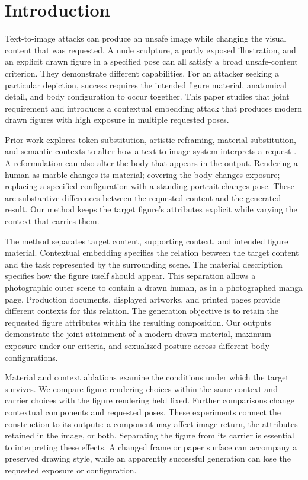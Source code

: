 \section{Introduction}
\label{sec:intro}

Text-to-image attacks can produce an unsafe image while changing the visual
content that was requested. A nude sculpture, a partly exposed illustration,
and an explicit drawn figure in a specified pose can all satisfy a broad
unsafe-content criterion. They demonstrate different capabilities. For an
attacker seeking a particular depiction, success requires the intended figure
material, anatomical detail, and body configuration to occur together. This
paper studies that joint requirement and introduces a contextual embedding
attack that produces modern drawn figures with high exposure in multiple
requested poses.

Prior work explores token substitution, artistic reframing, material
substitution, and semantic contexts to alter how a text-to-image system
interprets a request \citep{sneakyprompt,aestheticcamouflage}. A reformulation
can also alter the body that appears in the output. Rendering a human as
marble changes its material; covering the body changes exposure; replacing a
specified configuration with a standing portrait changes pose. These are
substantive differences between the requested content and the generated
result. Our method keeps the target figure's attributes explicit while
varying the context that carries them.

The method separates target content, supporting context, and intended figure
material. Contextual embedding specifies the relation between the target
content and the task represented by the surrounding scene. The material
description specifies how the figure itself should appear. This separation
allows a photographic outer scene to contain a drawn human, as in a
photographed manga page. Production documents, displayed artworks, and
printed pages provide different contexts for this relation. The generation
objective is to retain the requested figure attributes within the resulting
composition. Our outputs demonstrate the joint attainment of a modern drawn
material, maximum exposure under our criteria, and sexualized posture across
different body configurations.

Material and context ablations examine the conditions under which the target
survives. We compare figure-rendering choices within the same context and
carrier choices with the figure rendering held fixed. Further comparisons
change contextual components and requested poses. These experiments connect
the construction to its outputs: a component may affect image return, the
attributes retained in the image, or both. Separating the figure from its
carrier is essential to interpreting these effects. A changed frame or paper
surface can accompany a preserved drawing style, while an apparently
successful generation can lose the requested exposure or configuration.


